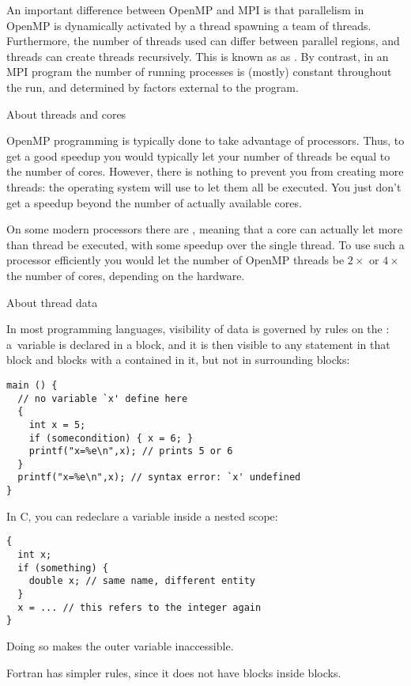 An important difference between OpenMP and MPI is that parallelism in
OpenMP is dynamically activated by a thread spawning a team of
threads. Furthermore,
the number of threads used can differ between parallel regions, and
threads can create threads recursively. This is known as
as . By contrast, in an MPI program the number
of running processes is (mostly) constant throughout the run, and
determined by factors external to the program.

 {About threads and cores}

OpenMP programming is typically done to take advantage of
 processors. Thus, to get a good speedup you
would typically let your number of threads be equal to the number of
cores. However, there is nothing to prevent you from creating more
threads: the operating system will use  to let
them all be executed. You just don't get a speedup beyond the number
of actually available cores.

On some modern processors there are ,
meaning that a core can actually let more than thread be executed,
with some speedup over the single thread. To use such a processor
efficiently you would let the number of OpenMP threads be $2\times$ or
$4\times$ the number of cores, depending on the hardware.

 {About thread data}

In most programming languages, visibility of data
is governed by rules on the :
a~variable is declared in a block, and it is then visible to any
statement in that block and blocks with a 
contained in it, but not in surrounding blocks:
\begin{verbatim}
main () {
  // no variable `x' define here
  {
    int x = 5;
    if (somecondition) { x = 6; }
    printf("x=%e\n",x); // prints 5 or 6
  }
  printf("x=%e\n",x); // syntax error: `x' undefined
}
\end{verbatim}

In C, you can redeclare a variable inside a nested scope:
\begin{verbatim}
{
  int x;
  if (something) {
    double x; // same name, different entity
  }
  x = ... // this refers to the integer again
}
\end{verbatim}
Doing so makes the outer variable inaccessible.

Fortran has simpler rules, since it does not have blocks inside blocks.

